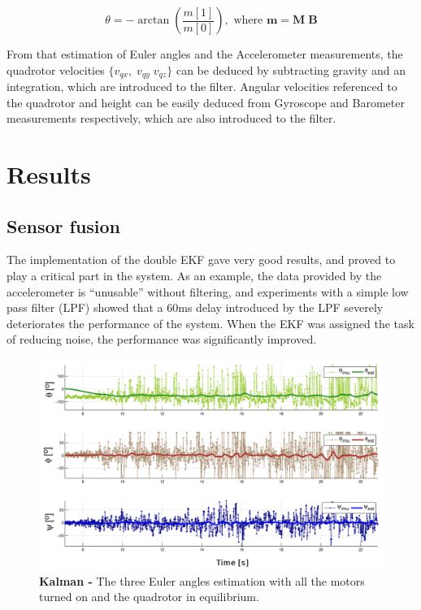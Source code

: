 \documentclass[conference]{IEEEtran}
\begin{document}
  \[
  \theta = -\arctan\left( \frac{m[1]}{m[0]}\right), \text{ where } \mathbf{m} = \mathbf{M} \; \mathbf{B}
  \]

From that estimation of Euler angles and the Accelerometer measurements, the quadrotor velocities $\{v_{qx},\;v_{qy}\;v_{qz}\}$ can be deduced by subtracting gravity and an integration, which are introduced to the filter. Angular velocities referenced to the quadrotor and height can be easily deduced from Gyroscope and Barometer measurements respectively, which are also introduced to the filter. %

\section{Results}

\subsection{Sensor fusion}

The implementation of the double EKF gave very good results, and proved to play a critical part in the system. As an example, the data provided by the accelerometer is ``unusable'' without filtering, and experiments with a simple low pass filter (LPF) showed that a 60ms delay introduced by the LPF severely deteriorates the performance of the system. When the EKF was assigned the task of reducing noise, the performance was significantly improved.

 \begin{figure}
	\includegraphics[width=1\columnwidth]{./pics_paper/kalman.pdf}
	\caption{\textbf{Kalman -} The three Euler angles estimation with all the motors turned on and the quadrotor in equilibrium.}
	\label{fig:kalman}
\end{figure}
\end{document}
